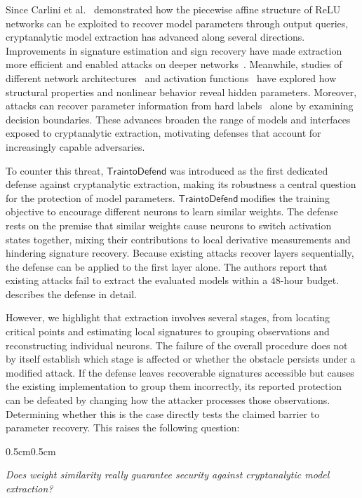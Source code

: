 \documentclass[runningheads]{llncs}
\newcommand{\td}{$\mathsf{Train to Defend}~$}
\begin{document}
Since Carlini et al.~\cite{carlini_crypto_cea1} demonstrated how the piecewise affine structure of ReLU networks can be exploited to recover model parameters through output queries, cryptanalytic model extraction has advanced along several directions.
Improvements in signature estimation and sign recovery have made extraction more efficient and enabled attacks on deeper networks~\cite{liu_eurocrypt_cea6}.
Meanwhile, studies of different network architectures~\cite{cryptoeprint:2026/1678-transformer,sun_acisp_cea7,li_eprint_cea8,cryptoeprint:2026/464-max-pooling-liu,cryptoeprint:2026/1164-cnn-maxpooling-chen} and activation functions~\cite{cryptoeprint:2026/178-nonlinear,cryptoeprint:2026/253-nonlinear} have explored how structural properties and nonlinear behavior reveal hidden parameters.
Moreover, attacks can recover parameter information from hard labels~\cite{chen_asiacrypt_cea3,carlini_eurocrypt_cea4,cryptoeprint:2026/2061-Normal-Alignment-Improved-Cryptanalytic-Sign-Recovery-on-Hard-Label-Networks,cryptoeprint:2026/2097-Efficient-Sign-Recovery} alone by examining decision boundaries.
These advances broaden the range of models and interfaces exposed to cryptanalytic extraction, motivating defenses that account for increasingly capable adversaries.


To counter this threat, $\mathsf{TraintoDefend}$\cite{kurian_neurips_ced1} was introduced as the first dedicated defense against cryptanalytic extraction, making its robustness a central question for the protection of model parameters.
\td modifies the training objective to encourage different neurons to learn similar weights.
The defense rests on the premise that similar weights cause neurons to switch activation states together, mixing their contributions to local derivative measurements and hindering signature recovery.
Because existing attacks recover layers sequentially, the defense can be applied to the first layer alone.
The authors report that existing attacks fail to extract the evaluated models within a $48$-hour budget.
 describes the defense in detail.

However, we highlight that extraction involves several stages, from locating critical points and estimating local signatures to grouping observations and reconstructing individual neurons.
The failure of the overall procedure does not by itself establish which stage is affected or whether the obstacle persists under a modified attack.
If the defense leaves recoverable signatures accessible but causes the existing implementation to group them incorrectly, its reported protection can be defeated by changing how the attacker processes those observations.
Determining whether this is the case directly tests the claimed barrier to parameter recovery.
This raises the following question:
\begin{adjustwidth}{0.5cm}{0.5cm}
\begin{center}
\textit{Does weight similarity really guarantee security against cryptanalytic model extraction?}
\end{center}
\end{adjustwidth}
\end{document}
